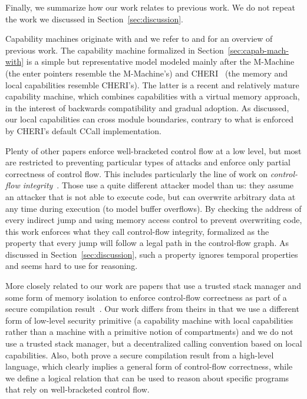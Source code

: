 \documentclass[format=acmsmall, review=true, screen=true]{acmart}
\renewcommand{\sectionname}{Section}
\newcommand\lau[1]{{\color{purple} \sf \footnotesize {LS: #1}}\\}
\renewcommand\lau[1]{}
\begin{document}
Finally, we summarize how our work relates to previous work. We do not
repeat the work we discussed in \sectionname~\ref{sec:discussion}.

Capability machines originate with \citet{Dennis:1966:PSM:365230.365252} and we refer to \citet{Levy1984capability} and \citet{Watson2015Cheri} for an overview
of previous work. The capability machine formalized in
\sectionname~\ref{sec:capab-mach-with} is a simple but representative
model modeled mainly after the
M-Machine~\citep{Carter:1994:HSF:195473.195579} (the enter pointers
resemble the M-Machine's) and
CHERI~\citep{Watson2015Cheri,Woodruff:2014:CCM:2665671.2665740} (the
memory and local capabilities resemble CHERI's). The latter is a
recent and relatively mature capability machine, which combines
capabilities with a virtual memory approach, in the interest of
backwards compatibility and gradual adoption. As discussed, our local
capabilities can cross module boundaries, 
contrary to what is enforced by CHERI's default CCall implementation.

Plenty of other papers\lau{If there are plenty, then I guess we should cite more
  than one?} enforce well-bracketed control flow at a low level, but most are
restricted to preventing particular types of attacks and enforce only partial
correctness of control flow. This includes particularly the line of work on
\emph{control-flow integrity}~\citep{abadi_control-flow_2005}. Those use a quite
different attacker model than us: they assume an attacker that is not able to
execute code, but can overwrite arbitrary data at any time during execution (to
model buffer overflows). By checking the address of every indirect jump and
using memory access control to prevent overwriting code, this work enforces what
they call control-flow integrity, formalized as the property that every jump
will follow a legal path in the control-flow graph. As discussed in
\sectionname~\ref{sec:discussion}, such a property ignores temporal properties and
seems hard to use for reasoning.

More closely related to our work are papers that use a trusted stack manager and
some form of memory isolation to enforce control-flow correctness as part of a
secure compilation
result~\citep{patrignani_modular_2016-1,juglaret_beyond_2016-1}. Our work
differs from theirs in that we use a different form of low-level security
primitive (a capability machine with local capabilities rather than a machine
with a primitive notion of compartments) and we do not use a trusted stack
manager, but a decentralized calling convention based on local
capabilities. Also, both prove a secure compilation result from a high-level
language, which clearly implies a general form of control-flow correctness,
while we define a logical relation that can be used to reason about
specific programs that rely on well-bracketed control flow.
\end{document}
